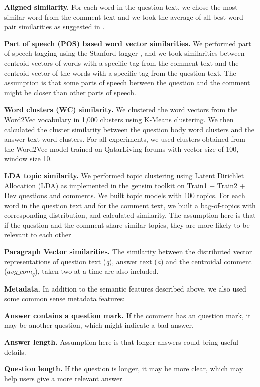 \documentclass[12pt, a4paper, oneside]{Thesis} %
\begin{document}
\textbf{Aligned similarity.} For each word in the question text, we chose the most similar word from the comment text and we took the average of all best word pair similarities as suggested in \cite{tran2015jaist}.

\textbf{Part of speech (POS) based word vector similarities.} We performed part of speech tagging using the Stanford tagger \cite{toutanova2003feature}, and we took similarities between centroid vectors of words with a specific tag from the comment text and the centroid vector of the words with a specific tag from the question text. The assumption is that some parts of speech between the question and the comment might be closer than other parts of speech.

\textbf{Word clusters (WC) similarity.} We clustered the word vectors from the Word2Vec vocabulary in 1,000 clusters using K-Means clustering. We then calculated the cluster similarity between the question body word clusters and the answer text word clusters. For all experiments, we used clusters obtained from the Word2Vec model trained on QatarLiving forums with vector size of 100, window size 10.

\textbf{LDA topic similarity.} We performed topic clustering using Latent Dirichlet Allocation (LDA) as implemented in the gensim toolkit \cite{rehurek2010software} on Train1 + Train2 + Dev questions and comments. We built topic models with 100 topics. For each word in the question text and for the comment text, we built a bag-of-topics with corresponding distribution, and calculated similarity. The assumption here is that if the question and the comment share similar topics, they are more likely to be relevant to each other

\textbf{Paragraph Vector similarities.} The similarity between the distributed vector representations of question text (\textit{q}), answer text (\textit{a}) and the centroidal comment ($avg\_com_q$), taken two at a time are also included.

\textbf{Metadata.} In addition to the semantic features described above, we also used some common sense metadata features:

\textbf{Answer contains a question mark.} If the comment has an question mark, it may be another question, which might indicate a bad answer.

\textbf{Answer length.} Assumption here is that longer answers could bring useful details.

\textbf{Question length.} If the question is longer, it may be more clear, which may help users give a more relevant answer.
\end{document}
